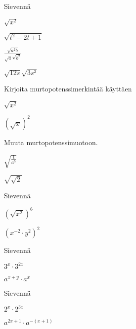 \begin{tehtava}
Sievennä
\begin{kohdat}
\item \(\sqrt{x^2}\)
\item \(\sqrt{t^2-2t + 1}\)
\item \(\displaystyle \frac{\sqrt{a^2b}}{\sqrt{a}\sqrt{b^2}}\)
\item \(\sqrt{12s}\sqrt{3s^3}\)
\end{kohdat}
\end{tehtava}

\begin{tehtava}
Kirjoita murtopotenssimerkintää käyttäen
\begin{kohdat}
\item \(\sqrt{x^2}\)
\item \(\displaystyle \left( \sqrt{x} \right)^2\)
\end{kohdat}
\end{tehtava}

\begin{tehtava}
Muuta murtopotenssimuotoon.
\begin{kohdat}
\item \(\displaystyle \sqrt{\frac{1}{a^5}}\)
\item \(\sqrt{\sqrt{2}}\)
\end{kohdat}
\end{tehtava}

\begin{tehtava}
Sievennä
\begin{kohdat}
\item \(\left( \sqrt{x^2} \right)^6\)
\item \(\left(x^{-2} \cdot y^2\right)^2\)
\end{kohdat}
\end{tehtava}

\begin{tehtava}
Sievennä
\begin{kohdat}
\item \(3^x \cdot 3^{2x}\)
\item \(a^{x+y} \cdot a^x\)
\end{kohdat}
\end{tehtava}

\begin{tehtava}
Sievennä
\begin{kohdat}
\item \(2^x \cdot 2^{3x}\)
\item \(a^{2x +1} \cdot a^{-(x+1)}\)
\end{kohdat}
\end{tehtava}

